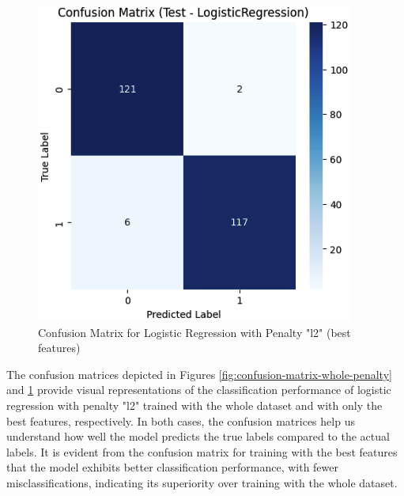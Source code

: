 \documentclass[conference]{IEEEtran}
\begin{document}
\begin{figure}[H]
    \centering
    \includegraphics[width=1\linewidth]{images/ConfusionMatrixPenaltyBestFeatures.png}
    \caption{Confusion Matrix for Logistic Regression with Penalty "l2" (best features)}
    \label{fig:confusion-matrix-best-penalty}
\end{figure}

The confusion matrices depicted in Figures \ref{fig:confusion-matrix-whole-penalty} and \ref{fig:confusion-matrix-best-penalty} provide visual representations of the classification performance of logistic regression with penalty "l2" trained with the whole dataset and with only the best features, respectively. In both cases, the confusion matrices help us understand how well the model predicts the true labels compared to the actual labels. It is evident from the confusion matrix for training with the best features that the model exhibits better classification performance, with fewer misclassifications, indicating its superiority over training with the whole dataset.
\end{document}
